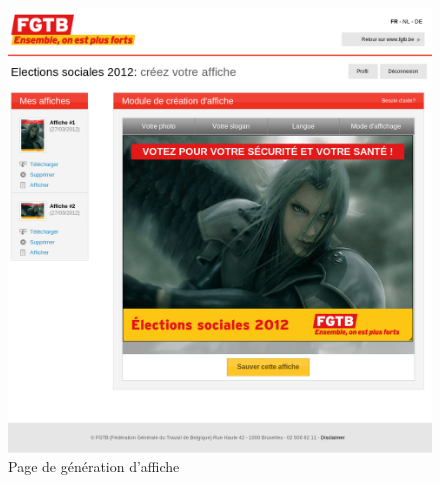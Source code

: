 \documentclass{article}
\begin{document}
\begin{sffamily}
\begin{enumerate}
\begin{figure}[h!]
\begin{center}
	   \includegraphics[width=\textwidth]{ergo_020.png} 
	   \caption{Page de génération d'affiche}
	\end{center}
\end{figure}
\end{enumerate}

\newpage


\end{sffamily}
\end{document}
